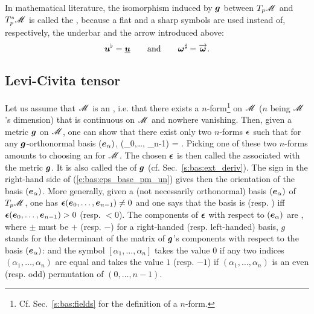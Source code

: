 \begin{remark}
In mathematical literature, the isomorphism induced by $\bm{g}$ between
${T_p\mathscr{M}}$ and ${T_p^*\mathscr{M}}$ is called the ,
because a flat and a sharp symbols are used instead of,
respectively, the underbar and the arrow introduced above:
\[
  \bm{u}^\flat = \underline{\bm{u}} \qquad\mbox{and}\qquad \bm{\omega}^\sharp = \overrightarrow{\bm{\bm{\omega}}} .
\]
\end{remark}


\subsection{Levi-Civita tensor} \label{s:bas:Levi-Civita_tensor}

Let us assume that $\mathscr{M}$ is an , i.e. that there exists a $n$-form\footnote{Cf. Sec.~\ref{s:bas:fields} for the definition of a $n$-form.} on $\mathscr{M}$ ($n$ being
$\mathscr{M}$'s dimension) that is continuous on $\mathscr{M}$ and nowhere vanishing.
Then, given a metric $\bm{g}$ on $\mathscr{M}$, one can show that there exist only two
$n$-forms $\bm{\epsilon}$ such that for any $\bm{g}$-orthonormal basis $(\bm{e}_\alpha)$,
\be \label{e:bas:eps_base_pm_un}
  \weps(_0,\ldots, _{n-1}) =  .
\ee
Picking one of these two $n$-forms amounts to choosing an
 for $\mathscr{M}$. The chosen $\bm{\epsilon}$
is then called the  associated with
the metric $\bm{g}$. It is also called the 
of $\bm{g}$ (cf. Sec.~\ref{s:bas:ext_deriv}).
The sign in the right-hand side of (\ref{e:bas:eps_base_pm_un})
gives then the orientation of the basis $(\bm{e}_\alpha)$.
More generally, given a (not necessarily orthonormal) basis $(\bm{e}_\alpha)$ of $T_p\mathscr{M}$,
one has $\bm{\epsilon}(\bm{e}_0,\ldots, \bm{e}_{n-1}) \neq 0$
and one says that the basis is 
(resp. )
iff $\bm{\epsilon}(\bm{e}_0,\ldots, \bm{e}_{n-1}) > 0$ (resp. $<0$).
The components of $\bm{\epsilon}$ with respect to $(\bm{e}_\alpha)$ are
\be \label{e:bas:eps_sqrt_g}
  ,
\ee
where $\pm$ must be $+$ (resp. $-$) for a right-handed (resp. left-handed) basis,
$g$ stands for the determinant of the matrix of $\bm{g}$'s components with respect
to the basis $(\bm{e}_\alpha)$:
\be \label{e:bas:def_det_g}
\ee
and the symbol $[\alpha_1, \ldots, \alpha_n]$ takes the value $0$ if any two indices
$(\alpha_1, \ldots, \alpha_n)$ are equal and takes the value $1$ (resp. $-1$) if
$(\alpha_1, \ldots, \alpha_n)$ is an even (resp. odd) permutation of
$(0,\ldots,n-1)$.

